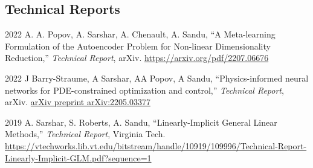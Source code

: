\documentclass[11pt,letterpaper]{report}
\newcommand{\paperinfo}[5]{
    \tab{}
    #1, %
    \enquote{#2,} %
    \textit{#3}, %
    #4. %
    \href{#5}{#5} %
}
\begin{document}





    \subsection*{Technical Reports}

    \begin{tablist}

        
        \item[2022] \paperinfo{A. A. Popov, A. Sarshar, A. Chenault, A. Sandu}
                                {A Meta-learning Formulation of the Autoencoder Problem for Non-linear Dimensionality Reduction}
                                {Technical Report}
                                {arXiv}
                                {https://arxiv.org/pdf/2207.06676}
        \item[2022] \paperinfo{J Barry-Straume, A Sarshar, AA Popov, A Sandu}
                                {Physics-informed neural networks for PDE-constrained optimization and control}
                                {Technical Report}
                                {arXiv}
                                {arXiv preprint arXiv:2205.03377}
        \item[2019] \paperinfo{A. Sarshar, S. Roberts, A. Sandu}
                                {Linearly-Implicit General Linear Methods}
                                {Technical Report}
                                {Virginia Tech}
                                {https://vtechworks.lib.vt.edu/bitstream/handle/10919/109996/Technical-Report-Linearly-Implicit-GLM.pdf?sequence=1}
    \end{tablist}



\end{document}
